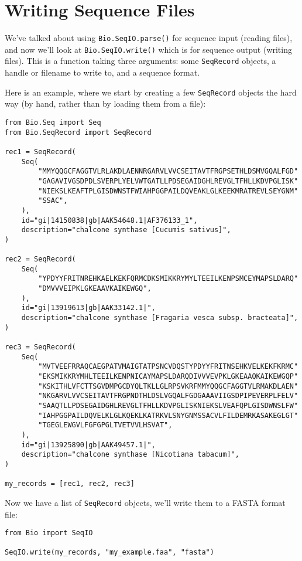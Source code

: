 \section{Writing Sequence Files}
\label{sec:writing-sequence-files}

We've talked about using \verb|Bio.SeqIO.parse()| for sequence input (reading files), and now we'll look at \verb|Bio.SeqIO.write()| which is for sequence output (writing files).  This is a function taking three arguments: some \verb|SeqRecord| objects, a handle or filename to write to, and a sequence format.

Here is an example, where we start by creating a few \verb|SeqRecord| objects the hard way (by hand, rather than by loading them from a file):

\begin{verbatim}
from Bio.Seq import Seq
from Bio.SeqRecord import SeqRecord

rec1 = SeqRecord(
    Seq(
        "MMYQQGCFAGGTVLRLAKDLAENNRGARVLVVCSEITAVTFRGPSETHLDSMVGQALFGD"
        "GAGAVIVGSDPDLSVERPLYELVWTGATLLPDSEGAIDGHLREVGLTFHLLKDVPGLISK"
        "NIEKSLKEAFTPLGISDWNSTFWIAHPGGPAILDQVEAKLGLKEEKMRATREVLSEYGNM"
        "SSAC",
    ),
    id="gi|14150838|gb|AAK54648.1|AF376133_1",
    description="chalcone synthase [Cucumis sativus]",
)

rec2 = SeqRecord(
    Seq(
        "YPDYYFRITNREHKAELKEKFQRMCDKSMIKKRYMYLTEEILKENPSMCEYMAPSLDARQ"
        "DMVVVEIPKLGKEAAVKAIKEWGQ",
    ),
    id="gi|13919613|gb|AAK33142.1|",
    description="chalcone synthase [Fragaria vesca subsp. bracteata]",
)

rec3 = SeqRecord(
    Seq(
        "MVTVEEFRRAQCAEGPATVMAIGTATPSNCVDQSTYPDYYFRITNSEHKVELKEKFKRMC"
        "EKSMIKKRYMHLTEEILKENPNICAYMAPSLDARQDIVVVEVPKLGKEAAQKAIKEWGQP"
        "KSKITHLVFCTTSGVDMPGCDYQLTKLLGLRPSVKRFMMYQQGCFAGGTVLRMAKDLAEN"
        "NKGARVLVVCSEITAVTFRGPNDTHLDSLVGQALFGDGAAAVIIGSDPIPEVERPLFELV"
        "SAAQTLLPDSEGAIDGHLREVGLTFHLLKDVPGLISKNIEKSLVEAFQPLGISDWNSLFW"
        "IAHPGGPAILDQVELKLGLKQEKLKATRKVLSNYGNMSSACVLFILDEMRKASAKEGLGT"
        "TGEGLEWGVLFGFGPGLTVETVVLHSVAT",
    ),
    id="gi|13925890|gb|AAK49457.1|",
    description="chalcone synthase [Nicotiana tabacum]",
)

my_records = [rec1, rec2, rec3]
\end{verbatim}

\noindent Now we have a list of \verb|SeqRecord| objects, we'll write them to a FASTA format file:

\begin{verbatim}
from Bio import SeqIO

SeqIO.write(my_records, "my_example.faa", "fasta")
\end{verbatim}

